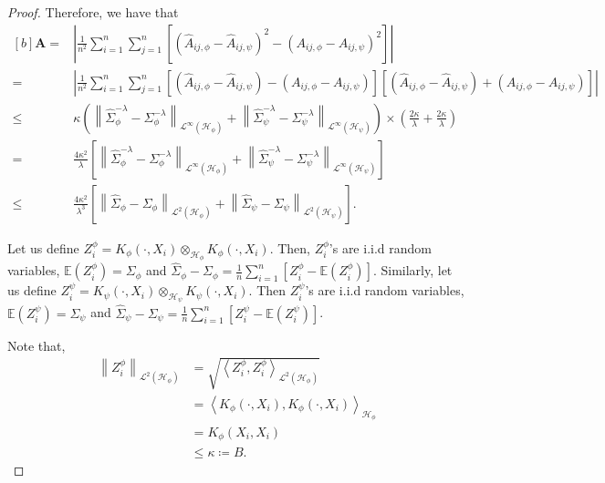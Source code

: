 \documentclass{article}
\theoremstyle{plain}
\newcommand{\E}{\mathbb{E}}
\newcommand{\HS}{\mathcal{L}^{2}}
\newcommand{\Op}{\mathcal{L}^{\infty}}
\newcommand{\repone}{\phi}
\newcommand{\reptwo}{\psi}
\newcommand{\Hone}{\mathcal{H}_{\phi}}
\newcommand{\Htwo}{\mathcal{H}_{\psi}}
\newcommand{\norm}[1]{\left\|#1\right\|}
\newcommand{\inprod}[1]{\left \langle #1 \right\rangle}
\begin{document}
\begin{proof}
Therefore, we have that 
\begin{equation}\label{Bound on A}
\begin{aligned}[b]
    \mathbf{A}
    =&\left|\frac{1}{n^{2}}\sum_{i=1}^{n}\sum_{j=1}^{n}\left[\left(\hat{A}_{ij,\repone}-\hat{A}_{ij,\reptwo}\right)^{2} - \left(A_{ij,\repone}-A_{ij,\reptwo}\right)^{2}\right]\right|\\
    =& \left|\frac{1}{n^{2}}\sum_{i=1}^{n}\sum_{j=1}^{n}\left[\left(\hat{A}_{ij,\repone}-\hat{A}_{ij,\reptwo}\right) - \left(A_{ij,\repone}-A_{ij,\reptwo}\right)\right]\right.\left.\left[\left(\hat{A}_{ij,\repone}-\hat{A}_{ij,\reptwo}\right) + \left(A_{ij,\repone}-A_{ij,\reptwo}\right)\right]\right|\\
    \leq& \kappa \left(\norm{\hat{\Sigma}_{\repone}^{-\lambda}-\Sigma_{\repone}^{-\lambda}}_{\Op(\Hone)} + \norm{\hat{\Sigma}_{\reptwo}^{-\lambda}-\Sigma_{\reptwo}^{-\lambda}}_{\Op(\Htwo)}\right)\times \left(\frac{2\kappa}{\lambda}+\frac{2\kappa}{\lambda}\right)\\
    =&\frac{4\kappa^{2}}{\lambda}\left[\norm{\hat{\Sigma}_{\repone}^{-\lambda}-\Sigma_{\repone}^{-\lambda}}_{\Op(\Hone)} + \norm{\hat{\Sigma}_{\reptwo}^{-\lambda}-\Sigma_{\reptwo}^{-\lambda}}_{\Op(\Htwo)}\right]\\
    \leq&\frac{4\kappa^{2}}{\lambda^{3}}\left[\norm{\hat{\Sigma}_{\repone}-\Sigma_{\repone}}_{\HS(\Hone)} + \norm{\hat{\Sigma}_{\reptwo}-\Sigma_{\reptwo}}_{\HS(\Htwo)}\right].
\end{aligned}
\end{equation}

Let us define $Z_{i}^{\repone} = K_{\repone}(\cdot,X_{i})\otimes_{\Hone}K_{\repone}(\cdot,X_{i})$. Then, $Z_{i}^{\repone}$'s are i.i.d random variables, $\E(Z_{i}^{\repone}) = \Sigma_{\repone}$ and $\hat{\Sigma}_{\repone} - \Sigma_{\repone} = \frac{1}{n}\sum_{i=1}^{n}\left[Z_{i}^{\repone}-\E(Z_{i}^{\repone})\right]$. Similarly, let us define $Z_{i}^{\reptwo} = K_{\reptwo}(\cdot,X_{i})\otimes_{\Htwo}K_{\reptwo}(\cdot,X_{i})$. Then $Z_{i}^{\reptwo}$'s are i.i.d random variables, $\E(Z_{i}^{\reptwo}) = \Sigma_{\reptwo}$ and $\hat{\Sigma}_{\reptwo} - \Sigma_{\reptwo} = \frac{1}{n}\sum_{i=1}^{n}\left[Z_{i}^{\reptwo}-\E(Z_{i}^{\reptwo})\right]$.

Note that,
\[
\begin{aligned}
    \norm{Z_{i}^{\repone}}_{\HS(\Hone)}    &=\sqrt{\inprod{Z_{i}^{\repone},Z_{i}^{\repone}}_{\HS(\Hone)}}\\
    &=\inprod{K_{\repone}(\cdot,X_{i}),K_{\repone}(\cdot,X_{i})}_{\Hone}\\
    &=K_{\repone}(X_{i},X_{i})\\
    &\leq \kappa \coloneq B.
\end{aligned}
\]


\end{proof}
\end{document}
